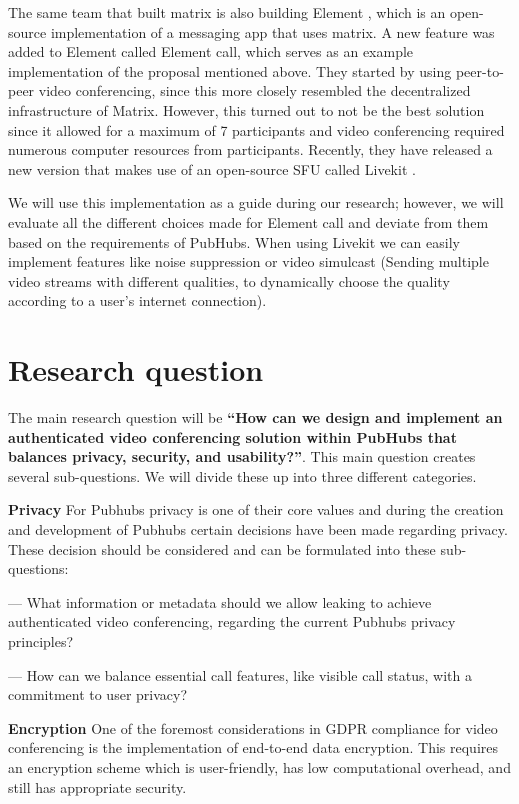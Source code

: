 \documentclass[11pt,a4paper]{article}
\begin{document}
The same team that built matrix is also building Element \cite{ELEMENT}, which is an open-source implementation of a messaging app that uses matrix. A new feature was added to Element called Element call, which serves as an example implementation of the proposal mentioned above. They started by using peer-to-peer video conferencing, since this more closely resembled the decentralized infrastructure of Matrix. However, this turned out to not be the best solution since it allowed for a maximum of 7 participants and video conferencing required numerous computer resources from participants. Recently, they have released a new version that makes use of an open-source SFU called Livekit \cite{LIVEKIT}.

We will use this implementation as a guide during our research; however, we will evaluate all the different choices made for Element call and deviate from them based on the requirements of PubHubs. When using Livekit we can easily implement features like noise suppression or video simulcast (Sending multiple video streams with different qualities, to dynamically choose the quality according to a user's internet connection).

\newpage
\section{Research question}
The main research question will be \textbf{“How can we design and implement an authenticated video conferencing solution within PubHubs that balances privacy, security, and usability?”}. This main question creates several sub-questions. We will divide these up into three different categories.

\textbf{Privacy}
For Pubhubs privacy is one of their core values and during the creation and development of Pubhubs certain decisions have been made regarding privacy. These decision should be considered and can be formulated into these sub-questions:

— What information or metadata should we allow leaking to achieve authenticated video conferencing, regarding the current Pubhubs privacy principles?

— How can we balance essential call features, like visible call status, with a commitment to user privacy?

\textbf{Encryption}
One of the foremost considerations in GDPR compliance for video conferencing is the implementation of end-to-end data encryption. This requires an encryption scheme which is user-friendly, has low computational overhead, and still has appropriate security.
\end{document}
